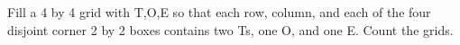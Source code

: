 Fill a 4 by 4 grid with T,O,E so that each row, column, and each of the four disjoint corner 2 by 2 boxes contains two Ts, one O, and one E. Count the grids.
